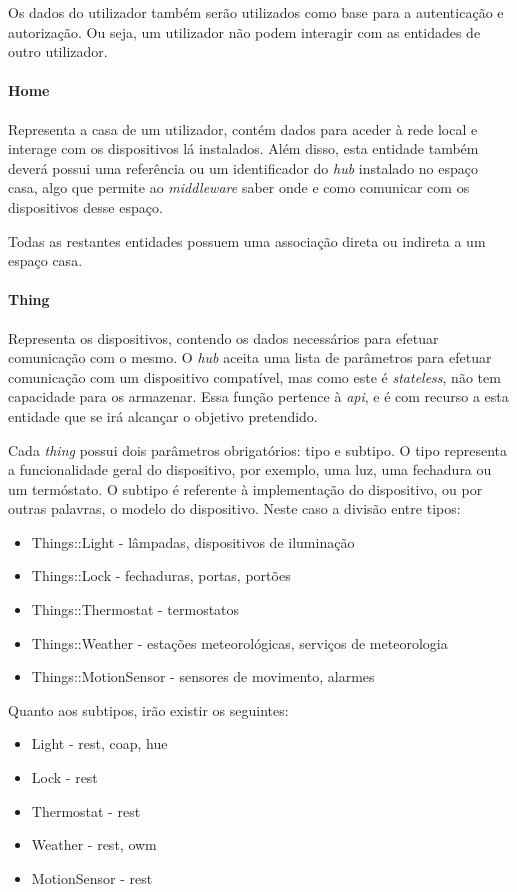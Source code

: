 Os dados do utilizador também serão utilizados como base para a autenticação e autorização. Ou seja, um utilizador não podem interagir com as entidades de outro utilizador.

\paragraph*{Home}
Representa a casa de um utilizador, contém dados para aceder à rede local e interage com os dispositivos lá instalados. Além disso, esta entidade também deverá possui uma referência ou um identificador do \textit{hub} instalado no espaço casa, algo que permite ao \textit{middleware} saber onde e como comunicar com os dispositivos desse espaço.

Todas as restantes entidades possuem uma associação direta ou indireta a um espaço casa.

\paragraph*{Thing}
Representa os dispositivos, contendo os dados necessários para efetuar comunicação com o mesmo. O \textit{hub} aceita uma lista de parâmetros para efetuar comunicação com um dispositivo compatível, mas como este é \textit{stateless}, não tem capacidade para os armazenar. Essa função pertence à \textit{api}, e é com recurso a esta entidade que se irá alcançar o objetivo pretendido.

Cada \textit{thing} possui dois parâmetros obrigatórios: tipo e subtipo. O tipo representa a funcionalidade geral do dispositivo, por exemplo, uma luz, uma fechadura ou um termóstato. O subtipo é referente à implementação do dispositivo, ou por outras palavras, o modelo do dispositivo. Neste caso a divisão entre tipos:

\begin{itemize}
    \item Things::Light - lâmpadas, dispositivos de iluminação
    \item Things::Lock - fechaduras, portas, portões
    \item Things::Thermostat - termostatos
    \item Things::Weather - estações meteorológicas, serviços de meteorologia
    \item Things::MotionSensor - sensores de movimento, alarmes
\end{itemize}

\newpage

Quanto aos subtipos, irão existir os seguintes:
\begin{itemize}
    \item Light - rest, coap, hue
    \item Lock - rest
    \item Thermostat - rest
    \item Weather - rest, owm
    \item MotionSensor - rest
\end{itemize}

